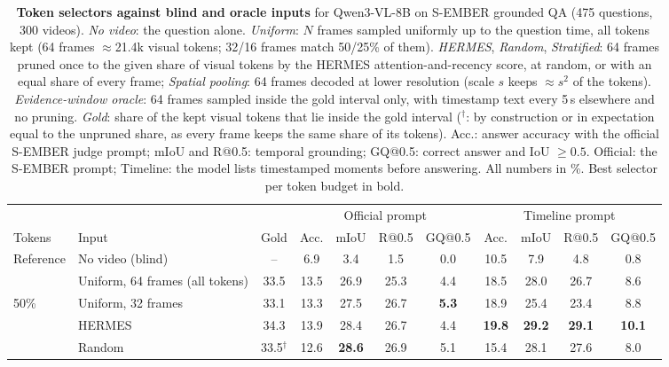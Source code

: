 \begin{table}[t]
\centering
\setlength{\tabcolsep}{4.5pt}
\caption{\textbf{Token selectors against blind and oracle inputs} for Qwen3-VL-8B on S-EMBER grounded QA (475 questions, 300 videos). \emph{No video}: the question alone. \emph{Uniform}: $N$ frames sampled uniformly up to the question time, all tokens kept (64 frames $\approx$21.4k visual tokens; 32/16 frames match 50/25\% of them). \emph{HERMES}, \emph{Random}, \emph{Stratified}: 64 frames pruned once to the given share of visual tokens by the HERMES attention-and-recency score, at random, or with an equal share of every frame; \emph{Spatial pooling}: 64 frames decoded at lower resolution (scale $s$ keeps $\approx s^2$ of the tokens). \emph{Evidence-window oracle}: 64 frames sampled inside the gold interval only, with timestamp text every 5\,s elsewhere and no pruning. \emph{Gold}: share of the kept visual tokens that lie inside the gold interval ($^\dagger$: by construction or in expectation equal to the unpruned share, as every frame keeps the same share of its tokens). Acc.: answer accuracy with the official S-EMBER judge prompt; mIoU and R@0.5: temporal grounding; GQ@0.5: correct answer and IoU $\geq 0.5$. Official: the S-EMBER prompt; Timeline: the model lists timestamped moments before answering. All numbers in \%. Best selector per token budget in bold.}
\label{tab:oracle}
\begin{tabular}{llccccccccc}
\toprule
& & & \multicolumn{4}{c}{Official prompt} & \multicolumn{4}{c}{Timeline prompt} \\
\cmidrule(lr){4-7} \cmidrule(lr){8-11}
Tokens & Input & Gold & Acc. & mIoU & R@0.5 & GQ@0.5 & Acc. & mIoU & R@0.5 & GQ@0.5 \\
\midrule
\multirow{2}{*}{Reference} & No video (blind) & -- & 6.9 & 3.4 & 1.5 & 0.0 & 10.5 & 7.9 & 4.8 & 0.8 \\
 & Uniform, 64 frames (all tokens) & 33.5 & 13.5 & 26.9 & 25.3 & 4.4 & 18.5 & 28.0 & 26.7 & 8.6 \\
\midrule
\multirow{5}{*}{50\%} & Uniform, 32 frames & 33.1 & 13.3 & 27.5 & 26.7 & \textbf{5.3} & 18.9 & 25.4 & 23.4 & 8.8 \\
 & HERMES & 34.3 & 13.9 & 28.4 & 26.7 & 4.4 & \textbf{19.8} & \textbf{29.2} & \textbf{29.1} & \textbf{10.1} \\
 & Random & 33.5$^\dagger$ & 12.6 & \textbf{28.6} & 26.9 & 5.1 & 15.4 & 28.1 & 27.6 & 8.0 \\

\end{tabular}
\end{table}
